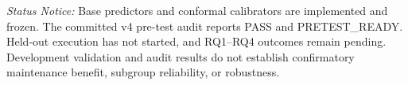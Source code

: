 \documentclass[12pt,a4paper,oneside]{report}
\begin{document}
\textit{Status Notice:} Base predictors and conformal calibrators are implemented and frozen. The committed v4 pre-test audit reports PASS and PRETEST\_READY. Held-out execution has not started, and RQ1–RQ4 outcomes remain pending. Development validation and audit results do not establish confirmatory maintenance benefit, subgroup reliability, or robustness.

\tableofcontents
\listoffigures
\listoftables

\clearpage
{}
\setcounter{page}{1}










\appendix


\clearpage


\end{document}
